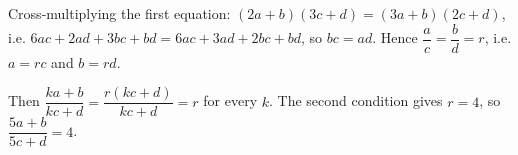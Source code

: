 Cross-multiplying the first equation: $(2a+b)(3c+d)=(3a+b)(2c+d)$, i.e. $6ac+2ad+3bc+bd=6ac+3ad+2bc+bd$, so $bc=ad$. Hence $\dfrac ac=\dfrac bd=r$, i.e. $a=rc$ and $b=rd$.

Then $\dfrac{ka+b}{kc+d}=\dfrac{r(kc+d)}{kc+d}=r$ for every $k$. The second condition gives $r=4$, so $\dfrac{5a+b}{5c+d}=\boxed{4}$.
